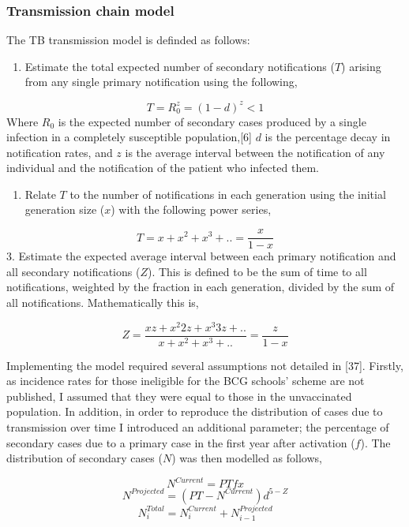 \documentclass[11pt,twoside]{bristolthesis}
\providecommand{\tightlist}{%
  \setlength{\itemsep}{0pt}\setlength{\parskip}{0pt}}
\begin{document}
  \hypertarget{transmission-chain-model}{%
  \subsubsection{Transmission chain model}\label{transmission-chain-model}}
  
  The TB transmission model is definded as follows:
  \begin{enumerate}
  \def\labelenumi{\arabic{enumi}.}
  \tightlist
  \item
    Estimate the total expected number of secondary notifications (\(T\)) arising from any single primary notification using the following,
  \end{enumerate}
  \[ T = R_0^z = (1-d)^z < 1 \]
  Where \(R_0\) is the expected number of secondary cases produced by a single infection in a completely susceptible population,{[}6{]} \(d\) is the percentage decay in notification rates, and \(z\) is the average interval between the notification of any individual and the notification of the patient who infected them.
  \begin{enumerate}
  \def\labelenumi{\arabic{enumi}.}
  \setcounter{enumi}{1}
  \tightlist
  \item
    Relate \(T\) to the number of notifications in each generation using the initial generation size (\(x\)) with the following power series,
  \end{enumerate}
  \[ T=x+x^2+x^3+ . . = \frac{x}{1-x} \]
  3. Estimate the expected average interval between each primary notification and all secondary notifications (\(Z\)). This is defined to be the sum of time to all notifications, weighted by the fraction in each generation, divided by the sum of all notifications. Mathematically this is,
  
  \[ Z = \frac{xz + x^{2}2z + x^{3}3z + . .}{x+x^2+x^3+ . . }= \frac{z}{1-x} \]
  
  Implementing the model required several assumptions not detailed in {[}37{]}. Firstly, as incidence rates for those ineligible for the BCG schools' scheme are not published, I assumed that they were equal to those in the unvaccinated population. In addition, in order to reproduce the distribution of cases due to transmission over time I introduced an additional parameter; the percentage of secondary cases due to a primary case in the first year after activation (\(f\)). The distribution of secondary cases (\(N\)) was then modelled as follows,
  
  \[ N^{Current} = P T  f  x \]
  \[ N^{Projected} = ( PT - N^{Current})d^{5-Z} \]
  \[ N_i^{Total} = N^{Current}_i + N^{Projected}_{i-1} \]
  
\end{document}

